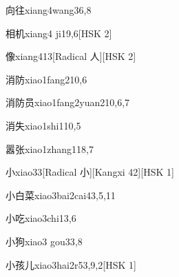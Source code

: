 \begin{entry}{向往}{xiang4wang3}{6,8}
\end{entry}

\begin{entry}{相机}{xiang4 ji1}{9,6}[HSK 2]
\end{entry}

\begin{entry}{像}{xiang4}{13}[Radical 人][HSK 2]
\end{entry}

\begin{entry}{消防}{xiao1fang2}{10,6}
\end{entry}

\begin{entry}{消防员}{xiao1fang2yuan2}{10,6,7}
\end{entry}

\begin{entry}{消失}{xiao1shi1}{10,5}
\end{entry}

\begin{entry}{嚣张}{xiao1zhang1}{18,7}
\end{entry}

\begin{entry}{小}{xiao3}{3}[Radical 小][Kangxi 42][HSK 1]
\end{entry}

\begin{entry}{小白菜}{xiao3bai2cai4}{3,5,11}
\end{entry}

\begin{entry}{小吃}{xiao3chi1}{3,6}
\end{entry}

\begin{entry}{小狗}{xiao3 gou3}{3,8}
\end{entry}

\begin{entry}{小孩儿}{xiao3hai2r5}{3,9,2}[HSK 1]
\end{entry}

